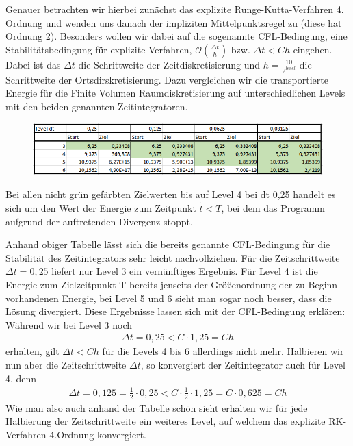 	Genauer betrachten wir hierbei zunächst das explizite Runge-Kutta-Verfahren 4. Ordnung und wenden uns danach der impliziten Mittelpunktsregel zu (diese hat Ordnung 2). Besonders wollen wir dabei auf die sogenannte CFL-Bedingung, eine Stabilitätsbedingung für explizite Verfahren,  $\mathcal{O}(\frac{\Delta t}{h})$ bzw. $\Delta t < Ch$ eingehen. Dabei ist das $\Delta t$ die Schrittweite der Zeitdiskretisierung und $h = \frac{10}{2^{level} }$ die Schrittweite der Ortsdirskretisierung. 
	Dazu vergleichen wir die transportierte Energie für die Finite Volumen Raumdiskretisierung auf unterschiedlichen Levels mit den beiden genannten Zeitintegratoren.

\begin{figure}[H]
	\centering
	\includegraphics[width=\textwidth]{../Aufgabe21/tabellefarbig.png}
\end{figure}
\begin{remark}
	Bei allen nicht grün gefärbten Zielwerten bis auf Level 4 bei dt 0,25 handelt es sich um den Wert der Energie zum Zeitpunkt $\tilde{t}<T$,  bei dem das Programm aufgrund der auftretenden Divergenz stoppt.
\end{remark}
Anhand obiger Tabelle lässt sich die bereits genannte CFL-Bedingung für die Stabilität des Zeitintegrators sehr leicht nachvollziehen. \newline
Für die Zeitschrittweite $\Delta t = 0,25$ liefert nur Level 3 ein vernünftiges Ergebnis. Für Level 4 ist die Energie zum Zielzeitpunkt T bereits jenseits der Größenordnung der zu Beginn vorhandenen Energie, bei Level 5 und 6 sieht man sogar noch besser, dass die Lösung divergiert. Diese Ergebnisse lassen sich mit der CFL-Bedingung erklären: \newline
Während wir bei Level 3 noch 
\begin{align*}
	\Delta t = 0,25 < C \cdot 1,25  = Ch
\end{align*} 
erhalten, gilt $ \Delta t < Ch$ für die Levels 4 bis 6 allerdings nicht mehr.
Halbieren wir nun aber die Zeitschrittweite $\Delta t$, so konvergiert der Zeitintegrator auch für Level 4, denn
\begin{align*}
	\Delta t =0,125 =  \frac{1}{2} \cdot 0,25 < C \cdot  \frac{1}{2} \cdot 1,25  =C \cdot 0,625 = Ch
\end{align*}
Wie man also auch anhand der Tabelle schön sieht erhalten wir für jede Halbierung der Zeitschrittweite ein weiteres Level, auf welchem das explizite RK-Verfahren 4.Ordnung konvergiert. 

